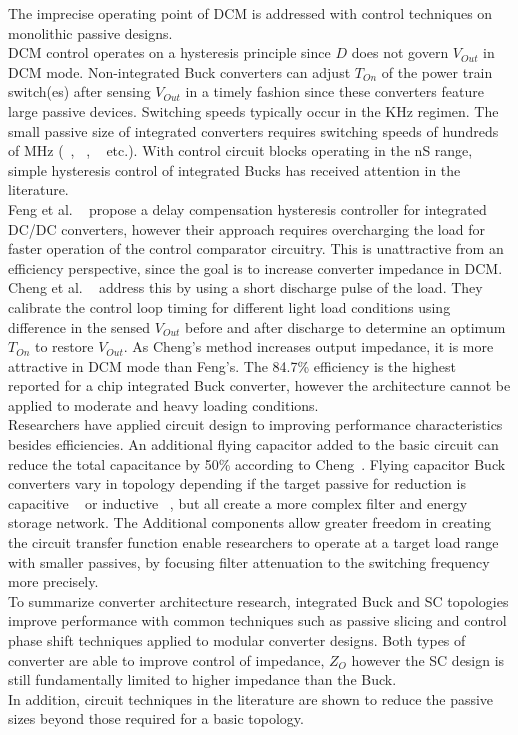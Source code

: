 \documentclass[letterpaper,twocolumn,10pt]{article}
\begin{document}
\indent The imprecise operating point of DCM is addressed with control techniques on monolithic passive designs.\\
DCM control operates on a hysteresis principle since $D$ does not govern $V_{Out}$ in DCM mode. Non-integrated Buck converters can adjust $T_{On}$ of the power train switch(es) after sensing $V_{Out}$ in a timely fashion since these converters feature large passive devices. Switching speeds typically occur in the KHz regimen. The small passive size of integrated converters requires switching speeds of hundreds of MHz (~\cite{Alimadadi2008}, ~\cite{Bathily2012}, ~\cite{Sturcken2013} etc.). With control circuit blocks operating in the nS range, simple hysteresis control of integrated Bucks has received attention in the literature.\\
Feng et al. ~\cite{Feng2008} propose a delay compensation hysteresis controller for integrated DC/DC converters, however their approach requires overcharging the load for faster operation of the control comparator circuitry. This is unattractive from an efficiency perspective, since the goal is to increase converter impedance in DCM. Cheng et al. ~\cite{Cheng2013} address this by using a short discharge pulse of the load. They calibrate the control loop timing for different light load conditions using difference in the sensed $V_{Out}$ before and after discharge to determine an optimum $T_{On}$ to restore $V_{Out}$. As Cheng's method increases output impedance, it is more attractive in DCM mode than Feng's. The 84.7\% efficiency is the highest reported for a chip integrated Buck converter, however the architecture cannot be applied to moderate and heavy loading conditions.\\  
\indent Researchers have applied circuit design to improving performance characteristics besides efficiencies. An additional flying capacitor added to the basic circuit can reduce the total capacitance by 50\% according to Cheng~\cite{ChengII2013}. Flying capacitor Buck converters vary in topology depending if the target passive for reduction is capacitive ~\cite{ChengII2013} or inductive ~\cite{Kim2011}, but all create a more complex filter and energy storage network. The Additional components allow greater freedom in creating the circuit transfer function enable researchers to operate at a target load range with smaller passives, by focusing filter attenuation to the switching frequency more precisely.\\

To summarize converter architecture research, integrated Buck and SC topologies improve performance with common techniques such as passive slicing and control phase shift techniques applied to modular converter designs. Both types of converter are able to improve control of impedance, $Z_O$ however the SC design is still fundamentally limited to higher impedance than the Buck.\\
In addition, circuit techniques in the literature are shown to reduce the passive sizes beyond those required for a basic topology.\\  
 
\end{document}
